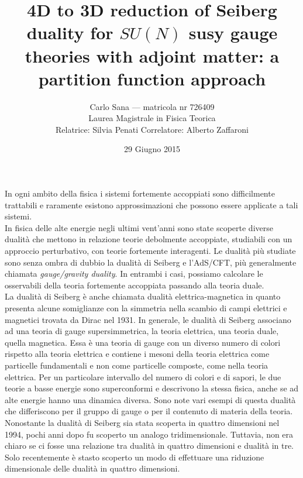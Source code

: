 \documentclass[a4paper,12pt]{article}
\author{
 Carlo Sana  --- matricola nr 726409 \\
 Laurea Magistrale in Fisica Teorica\\
Relatrice: Silvia Penati 
Correlatore: Alberto Zaffaroni\\
}
\date{29 Giugno 2015}
\title{ \textbf{4D to 3D reduction of Seiberg duality for $SU(N)$ susy gauge theories with adjoint matter: a partition function approach }}
\begin{document}
\maketitle
In ogni ambito della fisica i sistemi fortemente accoppiati sono difficilmente trattabili e raramente esistono approssimazioni che possono essere applicate a tali sistemi.
\\
In fisica delle alte energie negli ultimi vent'anni sono state scoperte diverse dualità che mettono in relazione teorie debolmente accoppiate, studiabili con un approccio perturbativo, con teorie fortemente interagenti.
Le dualità più studiate sono senza ombra di dubbio la dualità di Seiberg e l'AdS/CFT, più generalmente chiamata \emph{gauge/gravity duality}. 
In entrambi i casi, possiamo calcolare le osservabili della teoria fortemente accoppiata passando alla teoria duale. \\
La dualità di Seiberg è anche chiamata dualità elettrica-magnetica in quanto presenta alcune somiglianze con la simmetria nella scambio di campi elettrici e magnetici trovata da Dirac nel 1931.
In generale, le dualità di Seiberg associano ad una teoria di gauge supersimmetrica, la teoria elettrica, una teoria duale, quella magnetica.
Essa è una teoria di gauge con un diverso numero di colori rispetto alla teoria elettrica e contiene i mesoni della teoria elettrica come particelle fundamentali e non come particelle composte, come nella teoria elettrica.
Per un particolare intervallo del numero di colori e di sapori, le due teorie a basse energie sono superconformi e descrivono la stessa fisica, anche se ad alte energie hanno una dinamica diversa.
Sono note vari esempi di questa dualità che differiscono per il gruppo di gauge o per il contenuto di materia della teoria.\\
Nonostante la dualità di Seiberg sia stata scoperta in quattro dimensioni nel 1994, pochi anni dopo fu scoperto un analogo tridimensionale.
Tuttavia, non era chiaro se ci fosse una relazione tra dualità in quattro dimensioni e dualità in tre.
Solo recentemente è stasto scoperto un modo di effettuare una riduzione dimensionale delle dualità in quattro dimensioni.
\end{document}
